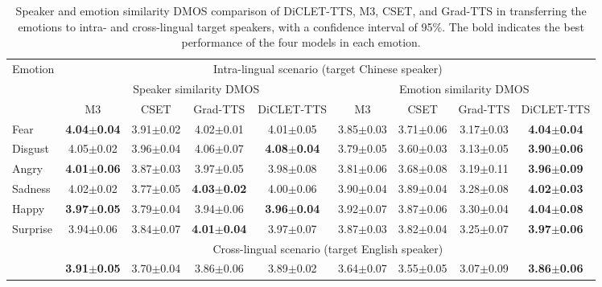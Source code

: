 \documentclass[journal,comsoc]{IEEEtran}
\begin{document}
\begin{table*}[h]
 \caption{Speaker and emotion similarity DMOS comparison of DiCLET-TTS, M3, CSET, and Grad-TTS in transferring the emotions to intra- and cross-lingual target speakers, with a confidence interval of 95$\%$. The bold indicates the best performance of the four models in each emotion.
 }
 \label{tab:emotiontransfer}
\setlength{\tabcolsep}{3.5mm}
 \centering
\begin{tabular}{l|cccc|cccc}
\toprule
\multicolumn{1}{c|}{\multirow{3}{*}{Emotion}} & \multicolumn{8}{c}{Intra-lingual scenario (target Chinese speaker)}  \\ \cmidrule{2-9} 
       & \multicolumn{4}{c|}{Speaker similarity DMOS}                                                  & \multicolumn{4}{c}{Emotion similarity DMOS}                                                \\ \cmidrule{2-9} 
       & \multicolumn{1}{c}{M3} & \multicolumn{1}{c}{CSET} & \multicolumn{1}{c}{Grad-TTS} & \multicolumn{1}{c|}{DiCLET-TTS} & \multicolumn{1}{c}{M3} & \multicolumn{1}{c}{CSET} & \multicolumn{1}{c}{Grad-TTS} & \multicolumn{1}{c}{DiCLET-TTS} \\ \midrule
Fear             &\bf{4.04}$\pm$0.04 &3.91$\pm$0.02 &4.02$\pm$0.01 &4.01$\pm$0.05   &3.85$\pm$0.03 &3.71$\pm$0.06 &3.17$\pm$0.03 &\bf{4.04}$\pm$0.04  \\
Disgust          &4.05$\pm$0.02 &3.96$\pm$0.04 &4.06$\pm$0.07 &\bf{4.08}$\pm$0.04   &3.79$\pm$0.05 &3.60$\pm$0.03 &3.13$\pm$0.05 &\bf{3.90}$\pm$0.06    \\ 
Angry            &\bf{4.01}$\pm$0.06 &3.87$\pm$0.03 &3.97$\pm$0.05 &3.98$\pm$0.08   &3.81$\pm$0.06 &3.68$\pm$0.08 &3.19$\pm$0.11 &\bf{3.96}$\pm$0.09    \\
Sadness          &4.02$\pm$0.02 &3.77$\pm$0.05 &\bf{4.03}$\pm$0.02 &4.00$\pm$0.06   &3.90$\pm$0.04 &3.89$\pm$0.04 &3.28$\pm$0.08 &\bf{4.02}$\pm$0.03    \\
Happy            &\bf{3.97}$\pm$0.05 &3.79$\pm$0.04 &3.94$\pm$0.06 &\bf{3.96}$\pm$0.04   &3.92$\pm$0.07 &3.87$\pm$0.06 &3.30$\pm$0.04 &\bf{4.04}$\pm$0.08    \\
Surprise         &3.94$\pm$0.06 &3.84$\pm$0.07 &\bf{4.01}$\pm$0.04 &3.97$\pm$0.07   &3.87$\pm$0.03 &3.82$\pm$0.04 &3.25$\pm$0.07 &\bf{3.97}$\pm$0.06   \\ \midrule
\multicolumn{1}{c}{\multirow{2}{*}{}} &  \multicolumn{8}{c}{Cross-lingual scenario (target English speaker)}  \\ \midrule 
Fear             &\bf{3.91}$\pm$0.05 &3.70$\pm$0.04 &3.86$\pm$0.06 &3.89$\pm$0.02   &3.64$\pm$0.07 &3.55$\pm$0.05 &3.07$\pm$0.09 &\bf{3.86}$\pm$0.06  \\

\end{tabular}
\end{table*}
\end{document}
